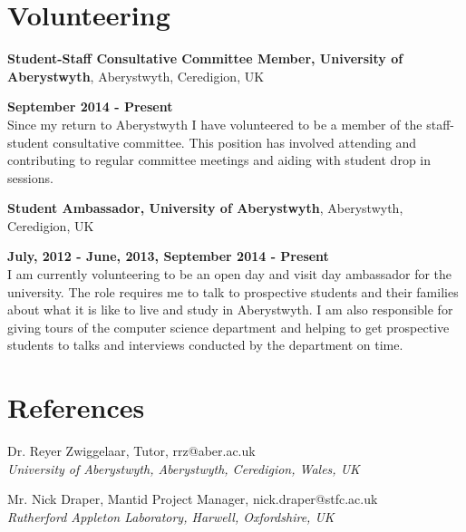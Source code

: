 \documentclass[margin,line]{res}
\begin{document}
\begin{resume}
\section{\sc Volunteering}
{\bf Student-Staff Consultative Committee Member, University of Aberystwyth}, Aberystwyth, Ceredigion, UK
\vspace{-.3cm}

\hfill {\bf September 2014 - Present}\\
Since my return to Aberystwyth I have volunteered to be a member of the staff-student consultative committee. This position has involved attending and contributing to regular committee meetings and aiding with student drop in sessions.

{\bf Student Ambassador, University of Aberystwyth}, Aberystwyth, Ceredigion, UK

\vspace{-.3cm}
\hfill {\bf July, 2012 - June, 2013, September 2014 - Present}\\
I am currently volunteering to be an open day and visit day ambassador for the university. The role requires me to talk to prospective students and their families about what it is like to live and study in Aberystwyth. I am also responsible for giving tours of the computer science department and helping to get prospective students to talks and interviews conducted by the department on time.


\section{\sc References}
Dr. Reyer Zwiggelaar, Tutor, rrz@aber.ac.uk \\
{\em University of Aberystwyth, Aberystwyth, Ceredigion, Wales, UK}

Mr. Nick Draper, Mantid Project Manager, nick.draper@stfc.ac.uk \\
{\em Rutherford Appleton Laboratory, Harwell, Oxfordshire, UK}

\end{resume}
\end{document}
